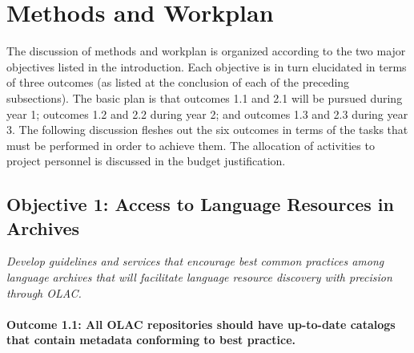 \section{Methods and Workplan}

The discussion of methods and workplan is organized according to
the two major objectives listed in the introduction.
Each objective is in turn elucidated in terms of three outcomes
(as listed at the conclusion of each of the preceding subsections).
The basic plan is that outcomes 1.1 and 2.1 will be pursued
during year 1; outcomes 1.2 and 2.2 during year 2;
and outcomes 1.3 and 2.3 during year 3.
The following discussion fleshes out the six outcomes in terms of the
tasks that must be performed in order to achieve them. The allocation of activities to project
personnel is discussed in the budget justification.


\subsection*{Objective 1: Access to Language Resources in Archives}

\emph{Develop guidelines and services that encourage best common
    practices among language archives that will 
    facilitate language resource discovery with precision through OLAC.}

\def\task{1.1}
\paragraph{Outcome {\task}: All OLAC repositories should have up-to-date catalogs
      that contain metadata conforming to best practice.}


